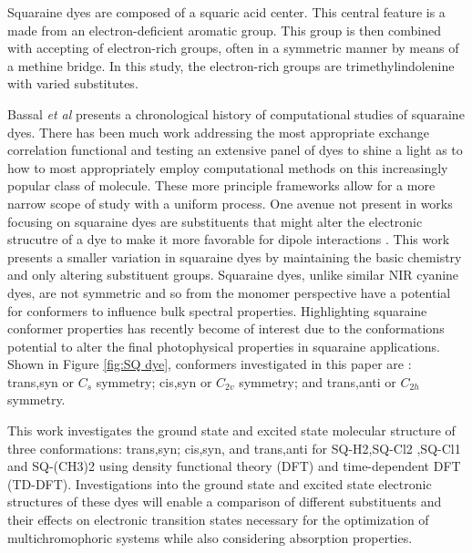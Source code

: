 \documentclass[journal=jacsat,manuscript=article]{achemso}
\begin{document}
Squaraine dyes are composed of a squaric acid center. This central feature is a made from an electron-deficient aromatic group. This group is then combined with accepting of electron-rich groups, often in a symmetric manner by means of a methine bridge\cite{Ilina2020SquaraineChallenges}⁠. In this study, the electron-rich groups are trimethylindolenine with varied substitutes.

Bassal \textit{et al} presents a chronological history of computational studies of squaraine dyes\cite{Bassal2017ExploringADC2}. There has been much work addressing the most appropriate exchange correlation functional and testing an extensive panel of dyes \citep{Jacquemin2012TD-DFTDyes,Jacquemin2016Excited-StateCC2,Jacquemin20150-0Compounds} to shine a light as to how to most appropriately employ computational methods on this increasingly popular class of molecule. These more principle frameworks allow for a more narrow scope of study with a uniform process. One avenue not present in works focusing on squaraine dyes are substituents that might alter the electronic strucutre of a dye to make it more favorable for dipole interactions \cite{Menke2014ExcitonCells}. This work presents a smaller variation in squaraine dyes by maintaining the basic chemistry and only altering substituent groups. Squaraine dyes, unlike similar NIR cyanine dyes, are not symmetric and so from the monomer perspective have a potential for conformers to influence bulk spectral properties\cite{Kolosova2018MolecularSquaraines}. Highlighting squaraine conformer properties has recently become of interest due to the conformations potential to alter the final photophysical properties in squaraine applications\citep{Paterno2018ExcitedScenario}. Shown in Figure \ref{fig:SQ dye}, conformers investigated in this paper are : trans,syn or $C_{s}$ symmetry; cis,syn or $C_{2v}$ symmetry; and trans,anti or $C_{2h}$ symmetry.

This work investigates the ground state and excited state molecular structure of three conformations: trans,syn; cis,syn, and trans,anti for SQ-H2,SQ-Cl2 ,SQ-Cl1 and SQ-(CH3)2 using density functional theory (DFT) and time-dependent DFT (TD-DFT). Investigations into the ground state and excited state electronic structures of these dyes will enable a comparison of different substituents and their effects on electronic transition states necessary for the optimization of multichromophoric systems while also considering absorption properties.  
\end{document}
